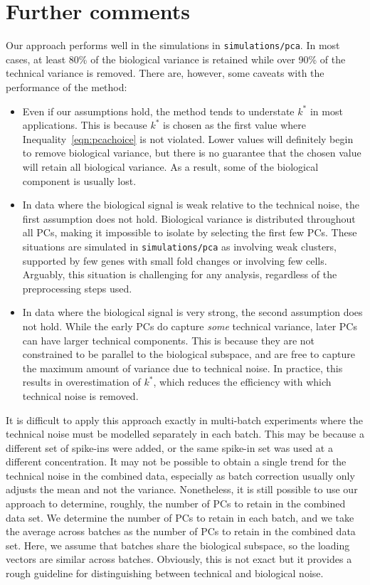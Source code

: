 \documentclass{article}
\begin{document}
\section*{Further comments}
Our approach performs well in the simulations in \texttt{simulations/pca}.
In most cases, at least 80\% of the biological variance is retained while over 90\% of the technical variance is removed.
There are, however, some caveats with the performance of the method:
\begin{itemize}
    \item Even if our assumptions hold, the method tends to understate $k^*$ in most applications.
        This is because $k^*$ is chosen as the first value where Inequality~\ref{eqn:pcachoice} is not violated.
        Lower values will definitely begin to remove biological variance, but there is no guarantee that the chosen value will retain all biological variance.
        As a result, some of the biological component is usually lost.
    \item In data where the biological signal is weak relative to the technical noise, the first assumption does not hold.
        Biological variance is distributed throughout all PCs, making it impossible to isolate by selecting the first few PCs.
        These situations are simulated in \texttt{simulations/pca} as involving weak clusters, supported by few genes with small fold changes or involving few cells.
        Arguably, this situation is challenging for any analysis, regardless of the preprocessing steps used.
    \item In data where the biological signal is very strong, the second assumption does not hold.
        While the early PCs do capture \textit{some} technical variance, later PCs can have larger technical components.
        This is because they are not constrained to be parallel to the biological subspace, and are free to capture the maximum amount of variance due to technical noise.
        In practice, this results in overestimation of $k^*$, which reduces the efficiency with which technical noise is removed.
\end{itemize}

It is difficult to apply this approach exactly in multi-batch experiments where the technical noise must be modelled separately in each batch.
This may be because a different set of spike-ins were added, or the same spike-in set was used at a different concentration.
It may not be possible to obtain a single trend for the technical noise in the combined data, especially as batch correction usually only adjusts the mean and not the variance.
Nonetheless, it is still possible to use our approach to determine, roughly, the number of PCs to retain in the combined data set.
We determine the number of PCs to retain in each batch, and we take the average across batches as the number of PCs to retain in the combined data set.
Here, we assume that batches share the biological subspace, so the loading vectors are similar across batches.
Obviously, this is not exact but it provides a rough guideline for distinguishing between technical and biological noise.
\end{document}
